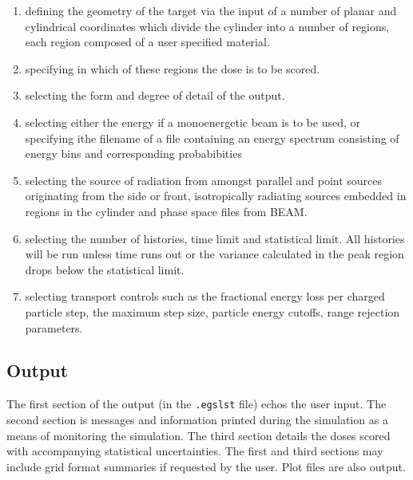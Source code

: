 \documentclass[12pt,twoside]{article}  %
\begin{document}
\begin{enumerate}

\item{defining the geometry of the target via the input of a
number of planar and cylindrical coordinates which
divide the cylinder into a number of regions, each region
composed of a user specified material.}

\item{specifying in which of these regions the dose is to be
scored.}

\item{selecting the form and degree of detail of the output.}

\item{selecting either the energy if a monoenergetic beam is to be
used, or specifying ithe filename of a file containing
an energy spectrum consisting of
energy bins and corresponding probabibities}

\item{selecting the source of radiation from amongst parallel and
point sources originating from the side or front,
isotropically radiating sources embedded in regions
in the cylinder and phase space files from BEAM.}

\item{selecting the number of histories, time limit and statistical
limit. All histories will be run unless time runs out or
the variance calculated in the peak region drops below
the statistical limit.}

\item{selecting transport controls such as the fractional energy
loss per charged particle step, the maximum step size,
particle energy cutoffs, range rejection parameters.}

\end{enumerate}


\subsection{Output}

The first section of the output (in the {\tt .egslst} file)
echos the user input.
The second section is messages and information printed
during the simulation as a means of monitoring the simulation.
The third section details the doses scored with
accompanying statistical uncertainties.
The first and third sections may include grid format summaries if
requested by the user. Plot files are also output.
\end{document}
